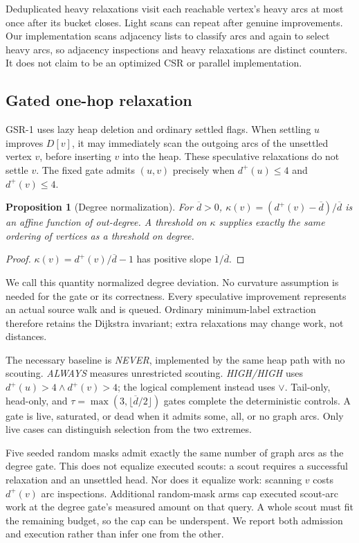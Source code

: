 \documentclass[11pt]{article}
\newtheorem{proposition}{Proposition}
\newcommand{\meand}{\overline{d}}
\begin{document}
Deduplicated heavy relaxations visit each reachable vertex's heavy arcs at most
once after its bucket closes. Light scans can repeat after genuine improvements.
Our implementation scans adjacency lists to classify arcs and again to select
heavy arcs, so adjacency inspections and heavy relaxations are distinct counters.
It does not claim to be an optimized CSR or parallel implementation.

\subsection{Gated one-hop relaxation}
GSR-1 uses lazy heap deletion and ordinary settled flags. When settling $u$
improves $D[v]$, it may immediately scan the outgoing arcs of the unsettled
vertex $v$, before inserting $v$ into the heap. These speculative relaxations
do not settle $v$. The fixed gate admits $(u,v)$ precisely when
$d^+(u)\le4$ and $d^+(v)\le4$.

\begin{proposition}[Degree normalization]
For $\meand>0$, $\kappa(v)=(d^+(v)-\meand)/\meand$ is an affine function of
out-degree. A threshold on $\kappa$ supplies exactly the same ordering of
vertices as a threshold on degree.
\end{proposition}
\begin{proof}
$\kappa(v)=d^+(v)/\meand-1$ has positive slope $1/\meand$.
\end{proof}
We call this quantity normalized degree deviation. No curvature assumption is
needed for the gate or its correctness. Every speculative improvement represents
an actual source walk and is queued. Ordinary minimum-label extraction therefore
retains the Dijkstra invariant; extra relaxations may change work, not distances.

The necessary baseline is \emph{NEVER}, implemented by the same heap path with
no scouting. \emph{ALWAYS} measures unrestricted scouting. \emph{HIGH/HIGH}
uses $d^+(u)>4\land d^+(v)>4$; the logical complement instead uses $\lor$.
Tail-only, head-only, and $\tau=\max(3,\lfloor\meand/2\rfloor)$ gates complete
the deterministic controls. A gate is live, saturated, or dead when it admits
some, all, or no graph arcs. Only live cases can distinguish selection from the
two extremes.

Five seeded random masks admit exactly the same number of graph arcs as the
degree gate. This does not equalize executed scouts: a scout requires a successful
relaxation and an unsettled head. Nor does it equalize work: scanning $v$ costs
$d^+(v)$ arc inspections. Additional random-mask arms cap executed scout-arc
work at the degree gate's measured amount on that query. A whole scout must fit
the remaining budget, so the cap can be underspent. We report both admission and
execution rather than infer one from the other.
\end{document}
